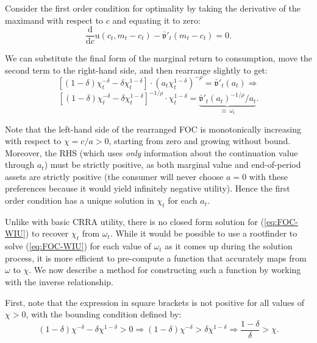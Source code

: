 \documentclass[12pt,letterpaper, fleqn]{article}
\newcommand{\CRRA}{\rho}
\newcommand{\uFunc}{\mathrm{u}}
\newcommand{\cNrm}{c}
\newcommand{\mNrm}{m}
\newcommand{\aNrm}{a}
\begin{document}
Consider the first order condition for optimality by taking the derivative of the maximand with respect to $\cNrm$ and equating it to zero:
\begin{equation}
\frac{\text{d}}{\text{d} \cNrm} \uFunc(\cNrm_t, \mNrm_t-\cNrm_t) - \bar{\mathfrak{v}}'_t(\mNrm_t - \cNrm_t) = 0.
\end{equation}

We can substitute the final form of the marginal return to consumption, move the second term to the right-hand side, and then rearrange slightly to get:
\begin{equation*}
\left[ (1-\delta) \chi_t^{-\delta} - \delta \chi_t^{1-\delta} \right] \cdot \left( \aNrm_t \chi_t^{1-\delta}  \right)^{-\CRRA} = \bar{\mathfrak{v}}'_t(\aNrm_t) \Longrightarrow
\end{equation*}
\begin{equation}
\label{eq:FOC-WIU}
\left[ (1-\delta) \chi_t^{-\delta} - \delta \chi_t^{1-\delta} \right]^{-1/\CRRA} \cdot \chi_t^{1-\delta}  = \underbrace{\bar{\mathfrak{v}}'_t(\aNrm_t)^{-1/\CRRA} / \aNrm_t}_{\equiv ~ \omega_t}.
\end{equation}

Note that the left-hand side of the rearranged FOC is monotonically increasing with respect to $\chi = \cNrm/\aNrm > 0$, starting from zero and growing without bound. Moreover, the RHS (which uses \textit{only} information about the continuation value through $\aNrm_t$) must be strictly positive, as both marginal value and end-of-period assets are strictly positive (the consumer will never choose $\aNrm=0$ with these preferences because it would yield infinitely negative utility). Hence the first order condition has a unique solution in $\chi_t$ for each $\aNrm_t$.

Unlike with basic CRRA utility, there is no closed form solution for (\ref{eq:FOC-WIU}) to recover $\chi_t$ from $\omega_t$. While it would be possible to use a rootfinder to solve (\ref{eq:FOC-WIU}) for each value of $\omega_t$ as it comes up during the solution process, it is more efficient to pre-compute a function that accurately maps from $\omega$ to $\chi$. We now describe a method for constructing such a function by working with the inverse relationship.

First, note that the expression in square brackets is not positive for all values of $\chi > 0$, with the bounding condition defined by:
\begin{equation}
(1-\delta) \chi^{-\delta} - \delta \chi^{1-\delta} > 0 \Longrightarrow (1-\delta) \chi^{-\delta} > \delta \chi^{1-\delta} \Longrightarrow \frac{1-\delta}{\delta} >\chi.
\end{equation}
\end{document}
